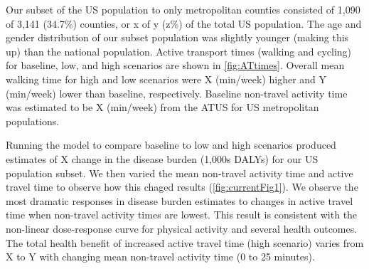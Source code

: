 Our subset of the US population to only metropolitan counties consisted of 1,090 of 3,141 (34.7\%) counties, or x of y (z\%) of the total US population. The age and gender distribution of our subset population was slightly younger (making this up) than the national population. Active transport times (walking and cycling) for baseline, low, and high scenarios are shown in \ref{fig:ATtimes}. Overall mean walking time for high and low scenarios were X (min/week) higher and Y (min/week) lower than baseline, respectively. Baseline non-travel activity time was estimated to be X (min/week) from the ATUS for US metropolitan populations.  

Running the model to compare baseline to low and high scenarios produced estimates of X change in the disease burden (1,000s DALYs) for our US population subset. We then varied the mean non-travel activity time and active travel time to observe how this chaged results (\ref{fig:currentFig1}). We observe the most dramatic responses in disease burden estimates to changes in active travel time when non-travel activity times are lowest. This result is consistent with the non-linear dose-response curve for physical activity and several health outcomes. The total health benefit of increased active travel time (high scenario) varies from X to Y with changing mean non-travel activity time (0 to 25 minutes). 


